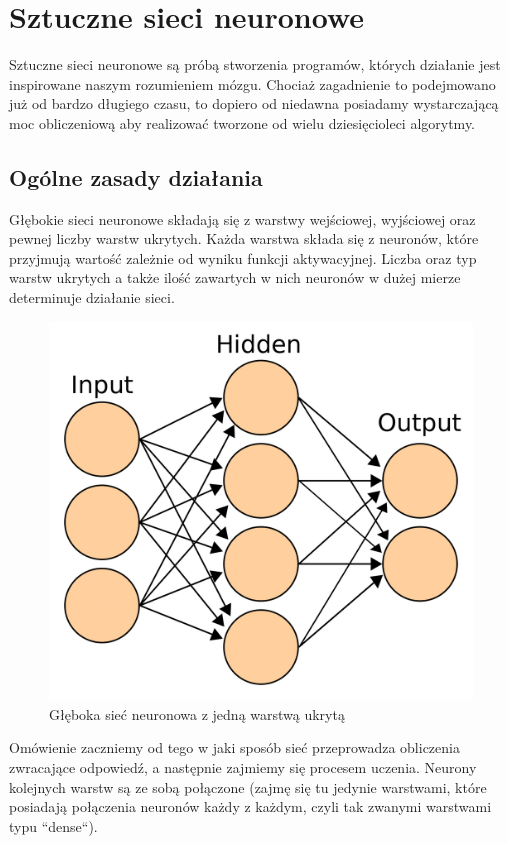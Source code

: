 \documentclass{article}
\begin{document}
\section{Sztuczne sieci neuronowe}
Sztuczne sieci neuronowe są próbą stworzenia programów, których działanie jest inspirowane naszym rozumieniem mózgu.
Chociaż zagadnienie to podejmowano już od bardzo długiego czasu, to dopiero od niedawna posiadamy wystarczającą moc obliczeniową aby realizować tworzone od wielu dziesięcioleci algorytmy.

\subsection{Ogólne zasady działania}
Głębokie sieci neuronowe składają się z warstwy wejściowej, wyjściowej oraz pewnej liczby warstw ukrytych.
Każda warstwa składa się z neuronów, które przyjmują wartość zależnie od wyniku funkcji aktywacyjnej.
Liczba oraz typ warstw ukrytych a także ilość zawartych w nich neuronów w dużej mierze determinuje działanie sieci.
\begin{figure}[H]
    \centering
    \includegraphics[width=\linewidth]{"images/dnn.png"}
    \caption{Głęboka sieć neuronowa z jedną warstwą ukrytą}
\end{figure}
Omówienie zaczniemy od tego w jaki sposób sieć przeprowadza obliczenia zwracające odpowiedź, a następnie zajmiemy się procesem uczenia.
Neurony kolejnych warstw są ze sobą połączone (zajmę się tu jedynie warstwami, które posiadają połączenia neuronów każdy z każdym, czyli tak zwanymi warstwami typu ``dense``).
\end{document}
